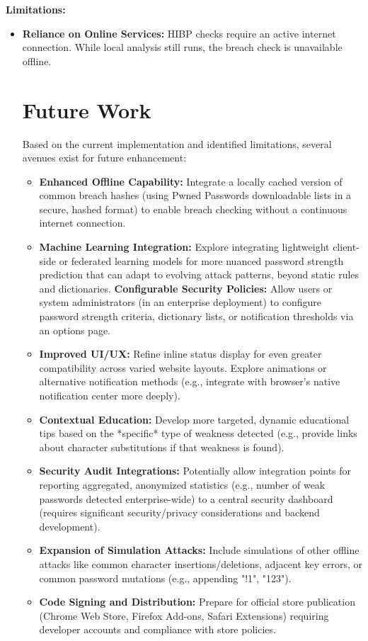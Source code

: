 \documentclass[11pt,oneside,a4paper]{book}
\begin{document}
\textbf{Limitations:}
\begin{itemize}
    \item \textbf{Reliance on Online Services:} HIBP checks require an active internet connection. While local analysis still runs, the breach check is unavailable offline.

\chapter{Future Work}
Based on the current implementation and identified limitations, several avenues exist for future enhancement:

\begin{itemize}
    \item \textbf{Enhanced Offline Capability:} Integrate a locally cached version of common breach hashes (using Pwned Passwords downloadable lists in a secure, hashed format) to enable breach checking without a continuous internet connection.
    \item \textbf{Machine Learning Integration:} Explore integrating lightweight client-side or federated learning models for more nuanced password strength prediction that can adapt to evolving attack patterns, beyond static rules and dictionaries.
    \textbf{Configurable Security Policies:} Allow users or system administrators (in an enterprise deployment) to configure password strength criteria, dictionary lists, or notification thresholds via an options page.
    \item \textbf{Improved UI/UX:} Refine inline status display for even greater compatibility across varied website layouts. Explore animations or alternative notification methods (e.g., integrate with browser's native notification center more deeply).
    \item \textbf{Contextual Education:} Develop more targeted, dynamic educational tips based on the *specific* type of weakness detected (e.g., provide links about character substitutions if that weakness is found).
    \item \textbf{Security Audit Integrations:} Potentially allow integration points for reporting aggregated, anonymized statistics (e.g., number of weak passwords detected enterprise-wide) to a central security dashboard (requires significant security/privacy considerations and backend development).
    \item \textbf{Expansion of Simulation Attacks:} Include simulations of other offline attacks like common character insertions/deletions, adjacent key errors, or common password mutations (e.g., appending "!1", "123").
    \item \textbf{Code Signing and Distribution:} Prepare for official store publication (Chrome Web Store, Firefox Add-ons, Safari Extensions) requiring developer accounts and compliance with store policies.
\end{itemize}


\end{itemize}
\end{document}
